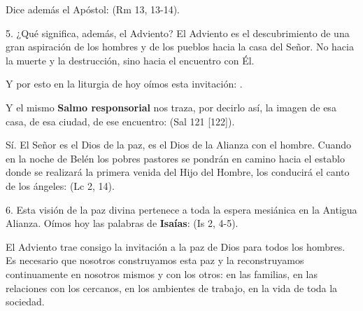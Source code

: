 \begin{body}
					Dice además el Apóstol:  (Rm 13, 13-14). 
					
					5. ¿Qué significa, además, el Adviento? El Adviento es el descubrimiento de una gran aspiración de los hombres y de los pueblos hacia la casa del Señor. No hacia la muerte y la destrucción, sino hacia el encuentro con Él. 
					
					Y por esto en la liturgia de hoy oímos esta invitación: . 
					
					Y el mismo \textbf{Salmo responsorial} nos traza, por decirlo así, la imagen de esa casa, de esa ciudad, de ese encuentro:  (Sal 121 {[}122{]}). 
					
					Sí. El Señor es el Dios de la paz, es el Dios de la Alianza con el hombre. Cuando en la noche de Belén los pobres pastores se pondrán en camino hacia el establo donde se realizará la primera venida del Hijo del Hombre, los conducirá el canto de los ángeles:  (Lc 2, 14). 
					
					6. Esta visión de la paz divina pertenece a toda la espera mesiánica en la Antigua Alianza. Oímos hoy las palabras de \textbf{Isaías}:  (Is 2, 4-5). 
					
					El Adviento trae consigo la invitación a la paz de Dios para todos los hombres. Es necesario que nosotros construyamos esta paz y la reconstruyamos continuamente en nosotros mismos y con los otros: en las familias, en las relaciones con los cercanos, en los ambientes de trabajo, en la vida de toda la sociedad. 
					

\end{body}
